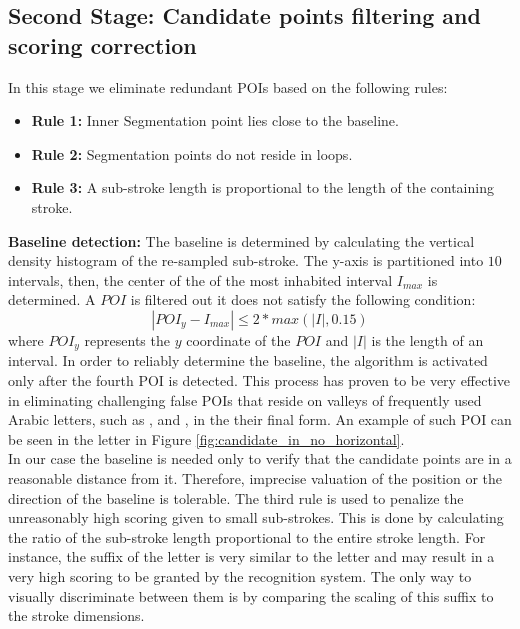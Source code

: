 \documentclass[journal,compsoc]{IEEEtran}
\begin{document}
\subsection{Second Stage: Candidate points filtering and scoring correction}
In this stage we eliminate redundant POIs based on the following rules:

\begin{itemize}
	\item[] \textbf{Rule 1:} Inner Segmentation point lies close to the baseline. 
	\item[] \textbf{Rule 2:} Segmentation points do not reside in loops.
	\item[] \textbf{Rule 3:} A sub-stroke length is proportional to the length of the containing stroke.\\
\end{itemize}

\textbf{Baseline detection:} The baseline is determined by calculating the vertical density histogram of the re-sampled sub-stroke. The y-axis is partitioned into $10$ intervals, then, the center of the of the most inhabited interval $I_{max}$ is determined. A $POI$ is filtered out it does not satisfy the following condition:
\begin{equation}
|POI_y-I_{max}| \leq 2*max{({|I|},0.15)} 
\end{equation}
where $POI_y$ represents the $y$ coordinate of the $POI$ and $|I|$ is the length of an interval. In order to reliably determine the baseline, the algorithm is activated only after the fourth POI is detected. This process has proven to be very effective in eliminating challenging false POIs that reside on valleys of frequently used Arabic letters, such as ,  and , in the their final form. An example of such POI can be seen in the letter  in Figure \ref{fig:candidate_in_no_horizontal}. \\

In our case the baseline is needed only to verify that the candidate points are in a reasonable distance from it. Therefore, imprecise valuation of the position or the direction of the baseline is tolerable.
The third rule is used to penalize the unreasonably high scoring given to small sub-strokes. 
This is done by calculating the ratio of the sub-stroke length proportional to the entire stroke length.
For instance, the suffix of the letter  is very similar to the letter  and may result in a very high scoring to be granted by the recognition system. 
The only way to visually discriminate between them is by comparing the scaling of this suffix to the stroke dimensions.\\
\end{document}
